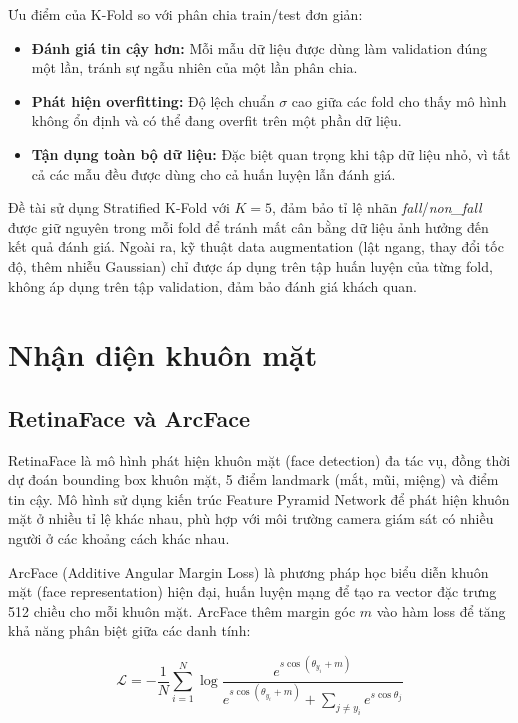 Ưu điểm của K-Fold so với phân chia train/test đơn giản:

\begin{itemize}
    \item \textbf{Đánh giá tin cậy hơn:} Mỗi mẫu dữ liệu được dùng làm validation đúng một lần, tránh sự ngẫu nhiên của một lần phân chia.
    \item \textbf{Phát hiện overfitting:} Độ lệch chuẩn $\sigma$ cao giữa các fold cho thấy mô hình không ổn định và có thể đang overfit trên một phần dữ liệu.
    \item \textbf{Tận dụng toàn bộ dữ liệu:} Đặc biệt quan trọng khi tập dữ liệu nhỏ, vì tất cả các mẫu đều được dùng cho cả huấn luyện lẫn đánh giá.
\end{itemize}

Đề tài sử dụng Stratified K-Fold với $K = 5$, đảm bảo tỉ lệ nhãn \textit{fall}/\textit{non\_fall} được giữ nguyên trong mỗi fold để tránh mất cân bằng dữ liệu ảnh hưởng đến kết quả đánh giá. Ngoài ra, kỹ thuật data augmentation (lật ngang, thay đổi tốc độ, thêm nhiễu Gaussian) chỉ được áp dụng trên tập huấn luyện của từng fold, không áp dụng trên tập validation, đảm bảo đánh giá khách quan.


\section{Nhận diện khuôn mặt}

\subsection{RetinaFace và ArcFace}

RetinaFace là mô hình phát hiện khuôn mặt (face detection) đa tác vụ, đồng thời dự đoán bounding box khuôn mặt, 5 điểm landmark (mắt, mũi, miệng) và điểm tin cậy. Mô hình sử dụng kiến trúc Feature Pyramid Network để phát hiện khuôn mặt ở nhiều tỉ lệ khác nhau, phù hợp với môi trường camera giám sát có nhiều người ở các khoảng cách khác nhau.

ArcFace (Additive Angular Margin Loss) là phương pháp học biểu diễn khuôn mặt (face representation) hiện đại, huấn luyện mạng để tạo ra vector đặc trưng 512 chiều cho mỗi khuôn mặt. ArcFace thêm margin góc $m$ vào hàm loss để tăng khả năng phân biệt giữa các danh tính:

\begin{equation}
    \mathcal{L} = -\frac{1}{N}\sum_{i=1}^{N}\log\frac{e^{s\cos(\theta_{y_i} + m)}}{e^{s\cos(\theta_{y_i}+m)} + \sum_{j \neq y_i} e^{s\cos\theta_j}}
\end{equation}

